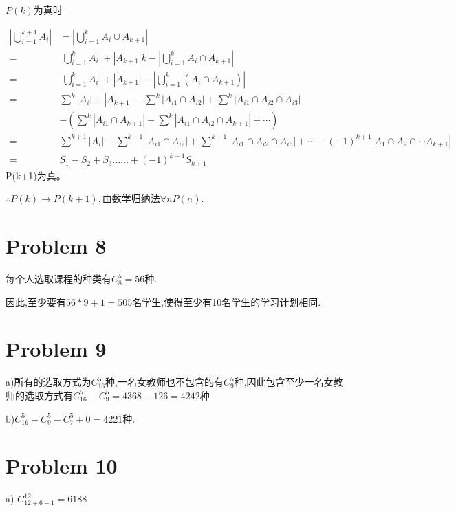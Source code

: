 \documentclass{article}
\begin{document}
$P(k)$为真时

\begin{equation}
    \nonumber
    \begin{aligned}
        \left|\bigcup_{i=1}^{k+1} A_{i}\right| &=\left|\bigcup_{i=1}^{k} A_{i} \cup A_{k+1}\right| \\
        =&\left|\bigcup_{i=1}^{k} A_{i}\right|+\left|A_{k+1}\right| k-\left|\bigcup_{i=1}^{k} A_{i} \cap A_{k+1}\right| \\
        =&\left|\bigcup_{i=1}^{k} A_{i}\right|+\left|A_{k+1}\right|-\left|\bigcup_{i=1}^{k}\left(A_{i} \cap A_{k+1}\right)\right| \\
        =& \sum_{}^{k}\left|A_{i}\right|+\left|A_{k+1}\right|-\sum^{k}\left|A_{i 1} \cap A_{i 2}\right|+\sum_{}^{k}\left|A_{i 1} \cap A_{i 2} \cap A_{i 3}\right| \\
        &-\left(\sum_{}^{k}\left|A_{i 1} \cap A_{k+1}\right|-\sum_{}^{k}\left|A_{i 1} \cap A_{i 2} \cap A_{k+1}\right|+\cdots\right) \\
        =& \sum_{}^{k+1}\left|A_{i}\right|-\sum_{}^{k+1}\left|A_{i 1} \cap A_{i 2}\right|+\sum_{}^{k+1}\left|A_{i 1} \cap A_{i 2} \cap A_{i 3}\right|+\cdots +(-1)^{k+1}\left|A_{1} \cap A_{2} \cap \cdots A_{k+1}\right| \\
        =& S_{1}-S_{2}+S_{3} \ldots \ldots+(-1)^{k+1} S_{k+1}
        \end{aligned}
\end{equation}
P(k+1)为真。

$\therefore P(k)\rightarrow P(k+1),$由数学归纳法$\forall nP(n).$

\section*{Problem 8}
每个人选取课程的种类有$C_{8}^{5}=56$种.

因此,至少要有$56*9+1=505$名学生,使得至少有10名学生的学习计划相同.

\section*{Problem 9}
a)所有的选取方式为$C_{16}^{5}$种,一名女教师也不包含的有$C_{9}^{5}$种,因此包含至少一名女教师的选取方式有$C_{16}^{5} - C_{9}^{5}=4368-126=4242$种

b)$C_{16}^{5}-C_{9}^{5}-C_{7}^{5}+0=4221$种.

\section*{Problem 10}
a) $C_{12+6-1}^{12}=6188$
\end{document}
